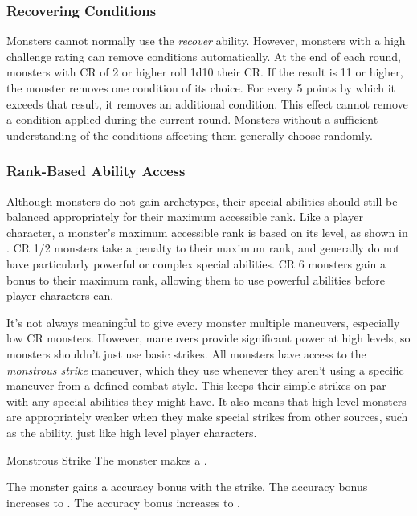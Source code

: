         \subsubsection{Recovering Conditions}
            Monsters cannot normally use the \textit{recover} ability.
            However, monsters with a high challenge rating can remove conditions automatically.
            At the end of each round, monsters with CR of 2 or higher roll 1d10 \add their CR.
            If the result is 11 or higher, the monster removes one condition of its choice.
            For every 5 points by which it exceeds that result, it removes an additional condition.
            This effect cannot remove a condition applied during the current round.
            Monsters without a sufficient understanding of the conditions affecting them generally choose randomly.

        \subsubsection{Rank-Based Ability Access}\label{Rank-Based Ability Access}
            Although monsters do not gain archetypes, their special abilities should still be balanced appropriately for their maximum accessible rank.
            Like a player character, a monster's maximum accessible rank is based on its level, as shown in .
            CR 1/2 monsters take a  penalty to their maximum rank, and generally do not have particularly powerful or complex special abilities.
            CR 6 monsters gain a  bonus to their maximum rank, allowing them to use powerful abilities before player characters can.

            It's not always meaningful to give every monster multiple maneuvers, especially low CR monsters.
            However, maneuvers provide significant power at high levels, so monsters shouldn't just use basic strikes.
            All monsters have access to the \textit{monstrous strike} maneuver, which they use whenever they aren't using a specific maneuver from a defined combat style.
            This keeps their simple strikes on par with any special abilities they might have.
            It also means that high level monsters are appropriately weaker when they make special strikes from other sources, such as the  ability, just like high level player characters.
            \begin{freeability}{Monstrous Strike}
                The monster makes a .

                \rankline
                 The monster gains a  accuracy bonus with the strike.
                 The accuracy bonus increases to .
                 The accuracy bonus increases to .
            \end{freeability}

